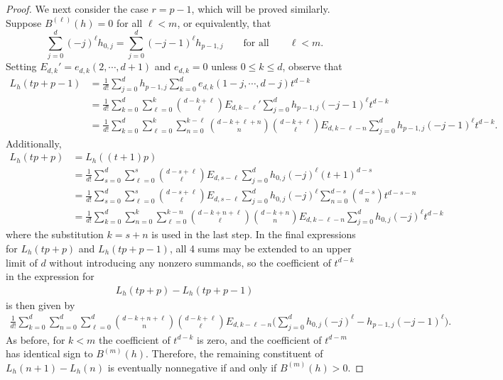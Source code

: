 \documentclass[10pt,a4paper]{amsart}
\begin{document}
\begin{proof}
We next consider the case $r=p-1$, which will be proved similarly.
Suppose  $B^{(\ell)}(h)=0$ for all $\ell<m$, or equivalently, that
$$
\sum_{j=0}^d (-j)^\ell h_{0,j}
= \sum_{j=0}^d (-j-1)^\ell h_{p-1,j}
\qquad \text{for all} \qquad
\ell < m.
$$
Setting $E_{d,k}' = e_{d,k}(2, \cdots, d+1)$ and $e_{d,k} = 0$ unless $0 \le k \le d$, observe that
\begin{align*}
L_h(tp + p - 1)
&= \frac{1}{d!} \sum_{j = 0}^d h_{p-1,j} \sum_{k = 0}^d e_{d,k}(1-j, \cdots, d-j) t^{d-k}
\\
&= \frac{1}{d!} \sum_{k = 0}^d \sum_{\ell = 0}^k \binom{d-k+\ell}{\ell} E_{d,k-\ell}' \sum_{j = 0}^d h_{p-1,j} (-j-1)^\ell t^{d-k}
\\
&= \frac{1}{d!} \sum_{k = 0}^d \sum_{\ell = 0}^k \sum_{n = 0}^{k-\ell} \binom{d-k+\ell+n}{n} \binom{d-k+\ell}{\ell} E_{d,k-\ell-n} \sum_{j = 0}^d h_{p-1,j} (-j-1)^\ell t^{d-k}.
\end{align*}
Additionally,
\begin{align*}
L_h(tp + p)
&= L_h((t+1)p)
\\
&= \frac{1}{d!} \sum_{s = 0}^d \sum_{\ell = 0}^s \binom{d-s+\ell}{\ell} E_{d,s-\ell} \sum_{j = 0}^d h_{0,j} (-j)^\ell (t+1)^{d-s}
\\
&= \frac{1}{d!} \sum_{s = 0}^d \sum_{\ell = 0}^s \binom{d-s+\ell}{\ell} E_{d,s-\ell} \sum_{j = 0}^d h_{0,j} (-j)^\ell \sum_{n = 0}^{d-s} \binom{d-s}{n} t^{d-s-n}
\\
&= \frac{1}{d!} \sum_{k = 0}^d \sum_{n = 0}^k \sum_{\ell = 0}^{k-n} \binom{d-k+n+\ell}{\ell} \binom{d-k+n}{n} E_{d,k-\ell-n} \sum_{j = 0}^d h_{0,j} (-j)^\ell t^{d-k}
\end{align*}
where the substitution $k = s + n$ is used in the last step.  In the final expressions for $L_h(tp + p)$ and $L_h(tp + p - 1)$, all 4 sums may be extended to an upper limit of $d$ without introducing any nonzero summands, so the coefficient of $t^{d-k}$ in the expression for 
\begin{align*}
L_h(tp + p) - L_h(tp + p - 1)
\end{align*}
is then given by
\begin{align*}
\frac{1}{d!} \sum_{k = 0}^d \sum_{n = 0}^d \sum_{\ell = 0}^d \binom{d-k+n+\ell}{n} \binom{d-k+\ell}{\ell} E_{d,k-\ell-n} \bigg(\sum_{j = 0}^d h_{0,j}(-j)^\ell - h_{p-1,j}(-j-1)^\ell \bigg).
\end{align*}
As before, for $k < m$ the coefficient of $t^{d-k}$ is zero, and the coefficient of $t^{d-m}$ has identical sign to $B^{(m)}(h)$. 
Therefore, the remaining constituent of $L_h(n+1) - L_h(n)$ is eventually nonnegative if and only if $B^{(m)}(h) > 0$.
\end{proof}
\end{document}
